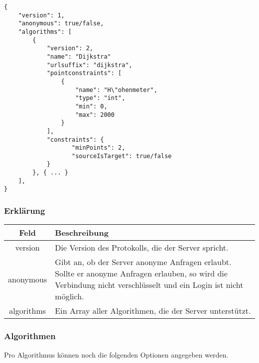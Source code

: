 \documentclass[ngerman]{scrartcl}
\begin{document}
	\begin{lstlisting}
{
    "version": 1,
    "anonymous": true/false,
    "algorithms": [
        {
            "version": 2,
            "name": "Dijkstra"
            "urlsuffix": "dijkstra",
            "pointconstraints": [                    
                {
                    "name": "H\"ohenmeter",
                    "type": "int",
                    "min": 0,
                    "max": 2000
                }
            ],
            "constraints": {
                   "minPoints": 2,
                   "sourceIsTarget": true/false 
            }
        }, { ... }
    ],
}
    \end{lstlisting}
    
    \subsubsection*{Erklärung}
    
    \begin{tabular}{|c|p{14cm}|}
    	\hline
    	\textbf{Feld} & \textbf{Beschreibung} \\ 
    	\hline \hline
    	
    	version & Die Version des Protokolls, die der Server spricht. \\ 
    	\hline
    	
    	anonymous & Gibt an, ob der Server anonyme Anfragen erlaubt. Sollte er anonyme Anfragen erlauben, so wird die Verbindung nicht verschlüsselt und ein Login ist nicht möglich. \\
    	\hline
    	
    	algorithms & Ein Array aller Algorithmen, die der Server unterstützt. \\
    	\hline
    \end{tabular}
    
    \subsubsection*{Algorithmen}
    
    Pro Algorithmus können noch die folgenden Optionen angegeben werden.
    
\end{document}

